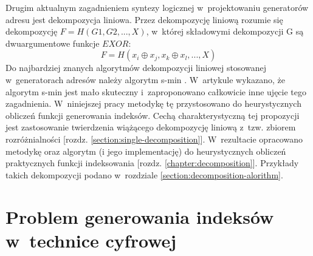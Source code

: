 Drugim aktualnym zagadnieniem syntezy logicznej w~projektowaniu generatorów adresu jest dekompozycja liniowa.
Przez dekompozycję liniową rozumie się dekompozycję $F = H(G1, G2, ...,  X)$,
w~której składowymi dekompozycji G są dwuargumentowe funkcje $EXOR$:
\begin{equation}
F = H (x_i \oplus x_j, x_k \oplus x_l, ..., X)
\end{equation}
Do najbardziej znanych algorytmów dekompozycji liniowej stosowanej w~generatorach adresów należy algorytm s-min \cite{sasao-recent, sasao-s-min}.
W~artykule \cite{redukcja-kompresja} wykazano, że algorytm s-min jest mało skuteczny i~zaproponowano całkowicie inne ujęcie tego zagadnienia.
W~niniejszej pracy metodykę tę przystosowano do heurystycznych obliczeń funkcji generowania indeksów.
Cechą charakterystyczną tej propozycji jest zastosowanie twierdzenia wiążącego dekompozycję liniową
z~tzw. zbiorem rozróżnialności [rozdz. \ref{section:single-decomposition}].
W~rezultacie opracowano metodykę oraz algorytm (i jego implementację) do heurystycznych obliczeń praktycznych funkcji indeksowania [rozdz. \ref{chapter:decomposition}].
Przykłady takich dekompozycji podano w~rozdziale \ref{section:decomposition-alorithm}.

\section{Problem generowania indeksów w~technice cyfrowej}

